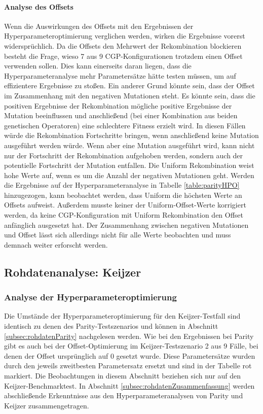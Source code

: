 \paragraph{Analyse des Offsets}
Wenn die Auswirkungen des Offsets mit den Ergebnissen der Hyperparameteroptimierung verglichen werden, wirken die Ergebnisse vorerst widersprüchlich.
Da die Offsets den Mehrwert der Rekombination blockieren besteht die Frage, wieso 7 aus 9 CGP-Kon\-fi\-gu\-ra\-tionen trotzdem einen Offset verwenden sollen.
Dies kann einerseits daran liegen, dass die Hyperparameteranalyse mehr Parametersätze hätte testen müssen, um auf effizientere Ergebnisse zu stoßen.
Ein anderer Grund könnte sein, dass der Offset im Zusammenhang mit den negativen Mutationen steht.
Es könnte sein, dass die positiven Ergebnisse der Rekombination mögliche positive Ergebnisse der Mutation beeinflussen und anschließend (bei einer Kombination aus beiden genetischen Operatoren) eine schlechtere Fitness erzielt wird.
In diesen Fällen würde die Rekombination Fortschritte bringen, wenn anschließend keine Mutation ausgeführt werden würde.
Wenn aber eine Mutation ausgeführt wird, kann nicht nur der Fortschritt der Rekombination aufgehoben werden, sondern auch der potentielle Fortschritt der Mutation entfallen.
Die Uniform Rekombination weist hohe Werte auf, wenn es um die Anzahl der negativen Mutationen geht. 
Werden die Ergebnisse auf der Hyperparameteranalyse in Tabelle \ref{table:parityHPO} hinzugezogen, kann beobachtet werden, dass Uniform die höchsten Werte an Offsets aufweist.
Außerdem musste keiner der Uniform-Offset-Werte korrigiert werden, da keine CGP-Konfiguration mit Uniform Rekombination den Offset anfänglich ausgesetzt hat.
Der Zusammenhang zwischen negativen Mutationen und Offset lässt sich allerdings nicht für alle Werte beobachten und muss demnach weiter erforscht werden.

\subsection{Rohdatenanalyse: Keijzer}
\label{subsec:rohdatenKeijzer}
\subsubsection{Analyse der Hyperparameteroptimierung}
Die Umstände der Hyperparameteroptimierung für den Keijzer-Testfall sind identisch zu denen des Parity-Testszenarios und können in Abschnitt \ref{subsec:rohdatenParity} nachgelesen werden.
Wie bei den Ergebnissen bei Parity gibt es auch bei der Offset-Optimierung im Keijzer-Test\-sze\-na\-rio 2 aus 9 Fälle, bei denen der Offset ursprünglich auf 0 gesetzt wurde.
Diese Parametersätze wurden durch den jeweils zweitbesten Parametersatz ersetzt und sind in der Tabelle rot markiert.
Die Beobachtungen in diesem Abschnitt beziehen sich nur auf den Keijzer-Benchmarktest.
In Abschnitt \ref{subsec:rohdatenZusammenfassung} werden abschließende Erkenntnisse aus den Hyperparameteranalysen von Parity und Keijzer zusammengetragen.
